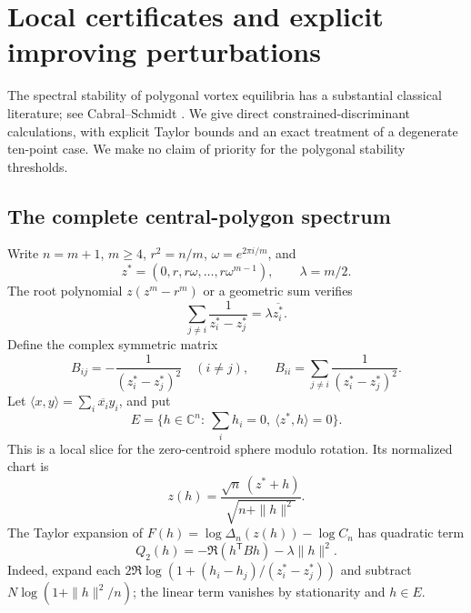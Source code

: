 \documentclass[11pt]{article}
\theoremstyle{remark}
\newcommand{\C}{\mathbb C}
\numberwithin{equation}{section}
\begin{document}
\section{Local certificates and explicit improving perturbations}
\label{sec:local-certificates}
The spectral stability of polygonal vortex equilibria has a substantial
classical literature; see Cabral--Schmidt \cite{CS}.
We give direct constrained-discriminant calculations, with explicit
Taylor bounds and an exact treatment of a degenerate ten-point case.
We make no claim of priority for the polygonal stability thresholds.

\subsection{The complete central-polygon spectrum}
Write $n=m+1$, $m\ge4$, $r^2=n/m$, $\omega=e^{2\pi i/m}$, and
\[
 z^*=(0,r,r\omega,\ldots,r\omega^{m-1}),\qquad \lambda=m/2.
\]
The root polynomial $z(z^m-r^m)$ or a geometric sum verifies
\[
 \sum_{j\ne i}\frac1{z_i^*-z_j^*}=\lambda\overline{z_i^*}.
\]
Define the complex symmetric matrix
\[
 B_{ij}=-\frac1{(z_i^*-z_j^*)^2}\quad(i\ne j),\qquad
 B_{ii}=\sum_{j\ne i}\frac1{(z_i^*-z_j^*)^2}.
\]
Let $\langle x,y\rangle=\sum_i\overline{x_i}y_i$, and put
\[
 E=\{h\in\C^n:\ \sum_i h_i=0,\ \langle z^*,h\rangle=0\}.
\]
This is a local slice for the zero-centroid sphere modulo rotation.
Its normalized chart is
\begin{equation}\label{eq:local-chart}
 z(h)=\frac{\sqrt n\,(z^*+h)}{\sqrt{n+\|h\|^2}}.
\end{equation}
The Taylor expansion of
$F(h)=\log\Delta_n(z(h))-\log C_n$ has quadratic term
\begin{equation}\label{eq:quadratic-slice}
 Q_2(h)=-\Re(h^{\mathsf T}Bh)-\lambda\|h\|^2.
\end{equation}
Indeed, expand each $2\Re\log(1+(h_i-h_j)/(z_i^*-z_j^*))$
and subtract $N\log(1+\|h\|^2/n)$; the linear term vanishes
by stationarity and $h\in E$.
\end{document}
